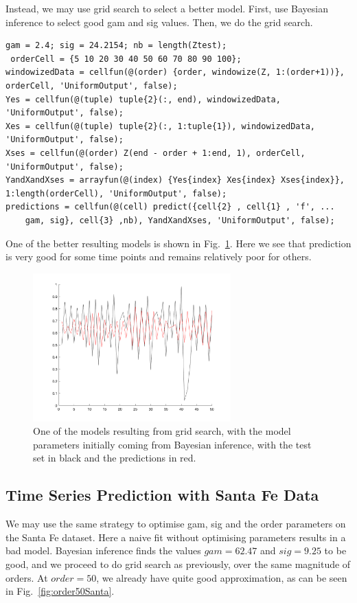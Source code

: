 \documentclass[10pt,a4paper]{article}
\begin{document}
 Instead, we may use grid search to select a better model. First, use Bayesian inference to select good gam and sig values. Then, we do the grid search.
 
 \begin{lstlisting}[style=Matlab-editor, frame=single]
 gam = 2.4; sig = 24.2154; nb = length(Ztest);
 orderCell = {5 10 20 30 40 50 60 70 80 90 100};
windowizedData = cellfun(@(order) {order, windowize(Z, 1:(order+1))}, orderCell, 'UniformOutput', false);
Yes = cellfun(@(tuple) tuple{2}(:, end), windowizedData, 'UniformOutput', false);
Xes = cellfun(@(tuple) tuple{2}(:, 1:tuple{1}), windowizedData, 'UniformOutput', false);
Xses = cellfun(@(order) Z(end - order + 1:end, 1), orderCell, 'UniformOutput', false);
YandXandXses = arrayfun(@(index) {Yes{index} Xes{index} Xses{index}}, 1:length(orderCell), 'UniformOutput', false);
predictions = cellfun(@(cell) predict({cell{2} , cell{1} , 'f', ...
    gam, sig}, cell{3} ,nb), YandXandXses, 'UniformOutput', false);
   \end{lstlisting}
  
One of the better resulting models is shown in Fig.~\ref{fig:model8Logmap}. Here we see that prediction is very good for some time points and remains relatively poor for others.
   
\begin{figure}[h!]
\centering
  \includegraphics[width=3in]{model8Logmap.png}
  \caption{One of the models resulting from grid search, with the model parameters initially coming from Bayesian inference, with the test set in black and the predictions in red.}
  \label{fig:model8Logmap}
\end{figure}

\subsection{Time Series Prediction with Santa Fe Data}

We may use the same strategy to optimise gam, sig and the order parameters on the Santa Fe dataset. Here a naive fit without optimising parameters results in a bad model. Bayesian inference finds the values $gam=62.47$ and $sig=9.25$ to be good, and we proceed to do grid search as previously, over the same magnitude of orders. At $order=50$, we already have quite good approximation, as can be seen in Fig.~\ref{fig:order50Santa}.
\end{document}
